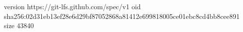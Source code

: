 version https://git-lfs.github.com/spec/v1
oid sha256:02d31eb13ef28e6d29bf87052868a81412e699818005ce01ebc8cd4bb8cee891
size 43840

